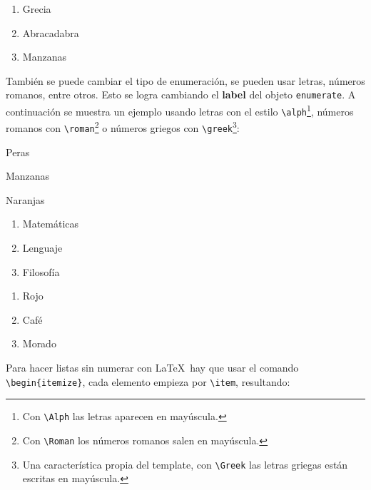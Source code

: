 		\begin{enumerate}
			\item Grecia
			\item Abracadabra
			\item Manzanas
		\end{enumerate}

		También se puede cambiar el tipo de enumeración, se pueden usar letras, números romanos, entre otros. Esto se logra cambiando el \textbf{label} del objeto \texttt{enumerate}. A continuación se muestra un ejemplo usando letras con el estilo \texttt{\textbackslash alph}\footnote{Con \texttt{\textbackslash Alph} las letras aparecen en mayúscula.}, números romanos con \texttt{\textbackslash roman}\footnote{Con \texttt{\textbackslash Roman} los números romanos salen en mayúscula.} o números griegos con \texttt{\textbackslash greek}\footnote{Una característica propia del template, con \texttt{\textbackslash Greek} las letras griegas están escritas en mayúscula.}:

		\begin{multicols}{3}
			\begin{enumeratebf}[label=\alph*) ] %
				\item Peras
				\item Manzanas
				\item Naranjas
			\end{enumeratebf}

			\begin{enumerate}[label=\greek*) ]
				\item Matemáticas
				\item Lenguaje
				\item Filosofía
			\end{enumerate}

			\begin{enumerate}[label=\roman*) ]
				\item Rojo
				\item Café
				\item Morado
			\end{enumerate}
		\end{multicols}

		Para hacer listas sin numerar con \LaTeX\ hay que usar el comando \texttt{\textbackslash begin\{itemize\}}, cada elemento empieza por \texttt{\textbackslash item}, resultando:

